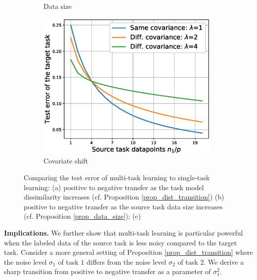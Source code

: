 \begin{figure}
\begin{subfigure}[b]{0.32\textwidth}
		\caption{Data size}
	\end{subfigure}\hfill
	\begin{subfigure}[b]{0.32\textwidth}
		\centering
		\includegraphics[width=0.98\textwidth]{figures/complementary.eps}
		\caption{Covariate shift}
		\label{fig_covariate}
	\end{subfigure}
	\caption{Comparing the test error of multi-task learning to single-task learning: (a) positive to negative transfer as the task model dissimilarity increases (cf. Proposition \ref{prop_dist_transition}) (b) positive to negative transfer as the source task data size increases (cf. Proposition \ref{prop_data_size}); (c) }
	\label{fig_model_shift_phasetrans}
\end{figure}

\textbf{Implications.}
We further show that multi-task learning is particular powerful when the labeled data of the source task is less noisy compared to the target task.
Consider a more general setting of Proposition \ref{prop_dist_transition} where the noise level $\sigma_1$ of task $1$ differs from the noise level $\sigma_2$ of task $2$.
We derive a sharp transition from positive to negative transfer as a parameter of $\sigma_1^2$.

